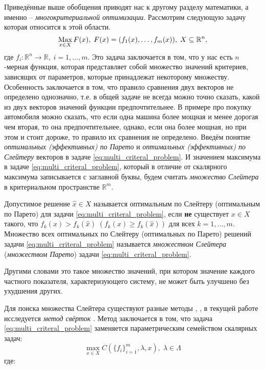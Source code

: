 Приведённые выше обобщения приводят нас к другому разделу
математики, а именно -- \textit{многокритериальной оптимизации}.
Рассмотрим следующую задачу которая относится к этой области.
\begin{equation}
	\label{eq:multi_criteral_problem}
	\operatorname*{Max} \limits_{x \in X} F(x), \; F(x)=({f}_1(x),\ldots, {f}_m(x))
	, \; X \subseteq \mathbb{R}^n,
\end{equation}
где $f_i: \mathbb{R}^n \rightarrow \mathbb{R}, \; i = 1, \ldots, m.$
Это задача заключается в том, что у нас есть $n$-мерная функция,
которая представляет собой множество значений критериев, зависящих
от параметров, которые принадлежат некоторому множеству.
Особенность заключается в том, что правило сравнения двух векторов
не определено однозначно, т.е. в общей задаче не всегда можно точно сказать,
какой из двух векторов значений функции предпочтительнее.
В примере про покупку автомобиля можно сказать, что если 
одна машина более мощная и менее дорогая чем вторая, то она предпочтительнее,
однако, если она более мощная, но при этом и стоит дороже, то
правило их сравнения не определено. 
Введём понятие \textit{оптимальных (эффективных) по Парето} и 
\textit{оптимальных (эффективных) по Слейтеру}
векторов в задаче \eqref{eq:multi_criteral_problem}.
И значением максимума в задаче \eqref{eq:multi_criteral_problem},
который в отличие от скалярного максимума записывается с заглавной буквы,
будем считать \textit{множество Слейтера} в критериальном пространстве 
$\mathbb{R}^m$.

\begin{Defenition}
	Допустимое решение $\hat{x}\in{X}$ называется 
	оптимальным по Слейтеру (оптимальным по Парето) для задачи		
	\eqref{eq:multi_criteral_problem},
	если \textbf{не} существует $x\in{X}$ такого, что 
	$f_k(x)>f_k(\hat{x}) \; (f_k(x) \geqslant f_k(\hat{x}))$ для всех
	$k = 1, \ldots ,m$. Множество всех оптимальных по Слейтеру 
	(оптимальных по Парето) решений задачи 
	\eqref{eq:multi_criteral_problem} называется 
	\textit{множеством Слейтера} (\textit{множеством Парето}) 
	задачи \eqref{eq:multi_criteral_problem}.
	\cite{ehrgott}
\end{Defenition}

Другими словами это такое множество значений, 
при котором значение каждого частного показателя, характеризующего систему, 
не может быть улучшено без ухудшения других.

Для поиска множества Слейтера существуют разные методы
\cite{ehrgott}, \cite{blackwell},
в текущей работе исследуется \textit{метод свёрток} \cite{germeyer}. 
Метод заключается в том, что задача \eqref{eq:multi_criteral_problem}
заменяется параметрическим семейством скалярных задач:
$$
	\max\limits_{x \in X} C(\{f_i\}_{i=1}^{m}, \lambda, x), \;
	\lambda \in \Lambda
$$
где: 
 
